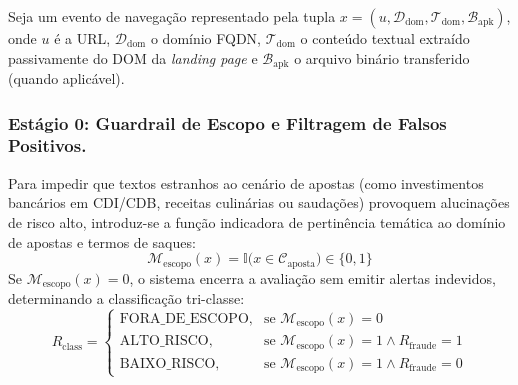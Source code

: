Seja um evento de navega\c{c}\~{a}o representado pela tupla $x = (u, \mathcal{D}_{\text{dom}}, \mathcal{T}_{\text{dom}}, \mathcal{B}_{\text{apk}})$, onde $u$ \'{e} a URL, $\mathcal{D}_{\text{dom}}$ o dom\'{i}nio FQDN, $\mathcal{T}_{\text{dom}}$ o conte\'{u}do textual extra\'{i}do passivamente do DOM da \textit{landing page} e $\mathcal{B}_{\text{apk}}$ o arquivo bin\'{a}rio transferido (quando aplic\'{a}vel).

\subsubsection{Est\'{a}gio 0: Guardrail de Escopo e Filtragem de Falsos Positivos.}
Para impedir que textos estranhos ao cen\'{a}rio de apostas (como investimentos banc\'{a}rios em CDI/CDB, receitas culin\'{a}rias ou sauda\c{c}\~{o}es) provoquem alucina\c{c}\~{o}es de risco alto, introduz-se a fun\c{c}\~{a}o indicadora de pertin\^{e}ncia temática ao dom\'{i}nio de apostas e termos de saques:
\begin{equation}
    \mathcal{M}_{\text{escopo}}(x) = \mathbb{I}\big(x \in \mathcal{C}_{\text{aposta}}\big) \in \{0, 1\}
\end{equation}
Se $\mathcal{M}_{\text{escopo}}(x) = 0$, o sistema encerra a avalia\c{c}\~{a}o sem emitir alertas indevidos, determinando a classifica\c{c}\~{a}o tri-classe:
\begin{equation}
    R_{\text{class}} = 
    \begin{cases}
        \text{FORA\_DE\_ESCOPO}, & \text{se } \mathcal{M}_{\text{escopo}}(x) = 0 \\
        \text{ALTO\_RISCO}, & \text{se } \mathcal{M}_{\text{escopo}}(x) = 1 \land R_{\text{fraude}} = 1 \\
        \text{BAIXO\_RISCO}, & \text{se } \mathcal{M}_{\text{escopo}}(x) = 1 \land R_{\text{fraude}} = 0
    \end{cases}
\end{equation}

